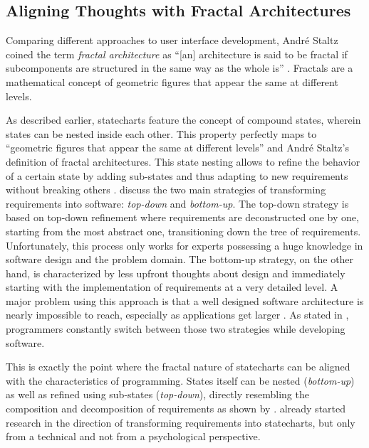 \subsection{Aligning Thoughts with Fractal Architectures}
\label{sub:aligning-thoughts-with-fractal-architectures}
Comparing different approaches to user interface development, André Staltz coined the term \emph{fractal architecture} as ``[an] architecture is said to be fractal if subcomponents are structured in the same way as the whole is'' \autocite{staltz_unidirectional_2015}.
Fractals are a mathematical concept of geometric figures that appear the same at different levels.

As described earlier, statecharts feature the concept of compound states, wherein states can be nested inside each other.
This property perfectly maps to ``geometric figures that appear the same at different levels'' and André Staltz's definition of fractal architectures.
This state nesting allows to refine the behavior of a certain state by adding sub-states and thus adapting to new requirements without breaking others \autocite{harel_statecharts:_1987}.
\textcite{leveson_experiences_1991} discuss the two main strategies of transforming requirements into software: \emph{top-down} and \emph{bottom-up}.
The top-down strategy is based on top-down refinement where requirements are deconstructed one by one, starting from the most abstract one, transitioning down the tree of requirements.
Unfortunately, this process only works for experts possessing a huge knowledge in software design and the problem domain.
The bottom-up strategy, on the other hand, is characterized by less upfront thoughts about design and immediately starting with the implementation of requirements at a very detailed level.
A major problem using this approach is that a well designed software architecture is nearly impossible to reach, especially as applications get larger \autocite{horrocks_constructing_1999}.
As stated in \textcite{leveson_experiences_1991}, programmers constantly switch between those two strategies while developing software.

This is exactly the point where the fractal nature of statecharts can be aligned with the characteristics of programming.
States itself can be nested (\emph{bottom-up}) as well as refined using sub-states (\emph{top-down}), directly resembling the composition and decomposition of requirements as shown by \textcite{leveson_experiences_1991}.
\textcite{glinz_statecharts_2002} already started research in the direction of transforming requirements into statecharts, but only from a technical and not from a psychological perspective.


